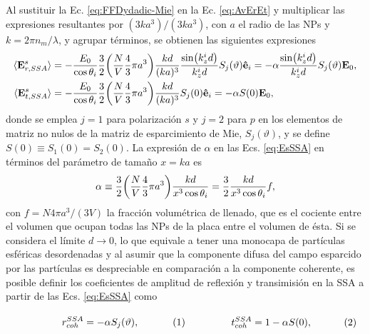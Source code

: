 Al sustituir la Ec. \eqref{eq:FFDydadic-Mie} en la Ec. \eqref{eq:AvErEt} y multiplicar las expresiones resultantes por $(3ka^3)/(3ka^3)$, con $a$ el radio de las NPs y $k = 2\pi n_m /\lambda$, y agrupar términos, se obtienen las siguientes expresiones 
%
	\begin{subequations}\begin{align}
		\langle \vb{E}^s_{r,SSA}\rangle & = - \frac{E_0}{\cos\theta_i} \frac32  \qty(\frac{N}{V} \frac43\pi a^3)\frac{kd}{(ka)^3}   \frac{\sin(k_z^id)}{k_z^i d}  S_j(\vartheta)\vu{e}_i =
		-\alpha  \frac{\sin(k_z^id)}{k_z^i d}   S_j(\vartheta) \vb{E}_0,
		\label{eqs:EsSSAr}\\
	\langle \vb{E}^s_{t,SSA}\rangle &=  - \frac{E_0}{\cos\theta_i} \frac32
						 \qty(\frac{N}{V}\frac43\pi a^3  ) \frac{kd}{(ka)^3}  S_j(0) \vu{e}_i  
						 = - \alpha S(0) \vb{E}_0,
		\label{eqs:EsSSAt}
	\end{align}\label{eq:EsSSA}\end{subequations}
%
donde  se emplea $j=1$ para polarización $s$ y $j=2$ para $p$ en los elementos de matriz no nulos de la matriz de esparcimiento de Mie, $S_j(\vartheta)$, y se define $S(0) \equiv S_1(0)=S_2(0)$. La expresión de $\alpha$ en las Ecs. \eqref{eq:EsSSA} en términos del parámetro de tamaño $x=ka$ es
%
\begin{align*}
	\alpha \equiv \frac32 \qty(\frac{N}{V}\frac43 \pi a^3  )\frac{kd}{x^3\cos\theta_i} = \frac32\frac{kd}{ x^3\cos\theta_i} f,
	\end{align*}
%
con $f= N 4\pi a^3/(3V)$ la fracción volumétrica de llenado, que es el cociente entre el volumen que ocupan todas las NPs de la placa entre el volumen de ésta. Si se considera el límite $d\to 0$, lo que equivale a tener una monocapa de partículas esféricas desordenadas y al asumir que la componente difusa del campo esparcido por las partículas es despreciable en comparación a la componente coherente, es posible definir los coeficientes de amplitud de reflexión y transimisión en la SSA a partir de las Ecs. \eqref{eq:EsSSA} como
	
	\begin{subequations}\eqhalf{r_{coh}^{SSA} = -\alpha S_j(\vartheta),}
	\eqhalf{t_{coh}^{SSA} = 1 - \alpha S(0), }
	\label{eqs:rtcohSSA}\end{subequations}\vspace*{-1em}	
	
